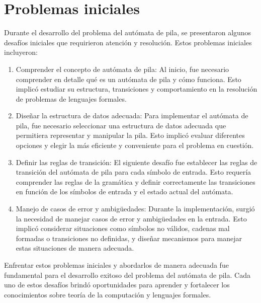\section{Problemas iniciales}
Durante el desarrollo del problema del autómata de pila, se presentaron algunos desafíos iniciales que requirieron atención y resolución. Estos problemas iniciales incluyeron:\newline
\begin{enumerate}
    \item Comprender el concepto de autómata de pila: Al inicio, fue necesario comprender en detalle qué es un autómata de pila y cómo funciona. Esto implicó estudiar su estructura, transiciones y comportamiento en la resolución de problemas de lenguajes formales.\newline

        
    \item Diseñar la estructura de datos adecuada: Para implementar el autómata de pila, fue necesario seleccionar una estructura de datos adecuada que permitiera representar y manipular la pila. Esto implicó evaluar diferentes opciones y elegir la más eficiente y conveniente para el problema en cuestión.\newline
    
    \item Definir las reglas de transición: El siguiente desafío fue establecer las reglas de transición del autómata de pila para cada símbolo de entrada. Esto requería comprender las reglas de la gramática y definir correctamente las transiciones en función de los símbolos de entrada y el estado actual del autómata.\newline
    
    \item Manejo de casos de error y ambigüedades: Durante la implementación, surgió la necesidad de manejar casos de error y ambigüedades en la entrada. Esto implicó considerar situaciones como símbolos no válidos, cadenas mal formadas o transiciones no definidas, y diseñar mecanismos para manejar estas situaciones de manera adecuada.\newline

\end{enumerate}


Enfrentar estos problemas iniciales y abordarlos de manera adecuada fue fundamental para el desarrollo exitoso del problema del autómata de pila. Cada uno de estos desafíos brindó oportunidades para aprender y fortalecer los conocimientos sobre teoría de la computación y lenguajes formales.




